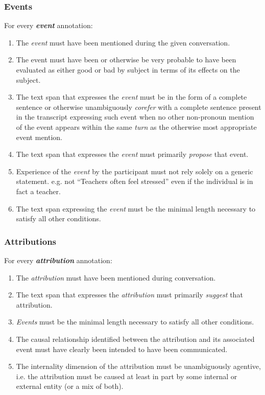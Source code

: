 \documentclass[a4paper,12pt]{article}
\begin{document}
    \subsubsection{Events}
    For every \textbf{\emph{event}} annotation:
        \begin{enumerate}
            \item The \emph{event} must have been mentioned during the given conversation.
            \item The event must have been or otherwise be very probable to have been evaluated as either good or bad by subject in terms of its effects on the subject.
            \item The text span that expresses the \emph{event} must be in the form of a complete sentence or otherwise unambiguously \emph{corefer} with a complete sentence present in the transcript expressing such event when no other non-pronoun mention of the event appears within the same \emph{turn} as the otherwise most appropriate event mention.
            \item The text span that expresses the \emph{event} must primarily \emph{propose} that event. %
            \item Experience of the \emph{event} by the participant must not rely solely on a generic statement.
                e.g. not ``Teachers often feel stressed'' even if the individual is in fact a teacher.
            \item The text span expressing the \emph{event} must be the minimal length necessary to satisfy all other conditions.
        \end{enumerate}


    \subsubsection{Attributions}
    For every \textbf{\emph{attribution}} annotation:
        \begin{enumerate}
            \item The \emph{attribution} must have been mentioned during conversation.
            \item The text span that expresses the \emph{attribution} must primarily \emph{suggest} that attribution. %
            \item \emph{Events} must be the minimal length necessary to satisfy all other conditions.
            \item The causal relationship identified between the attribution and its associated event must have clearly been intended to have been communicated.
            \item The internality dimension of the attribution must be unambiguously agentive, i.e. the attribution must be caused at least in part by some internal or external entity (or a mix of both).
        \end{enumerate}
\end{document}
